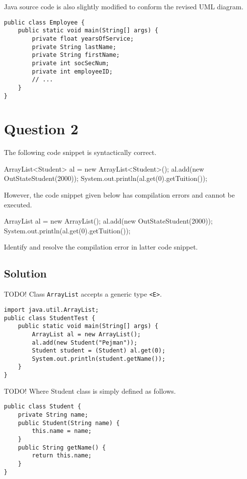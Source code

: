Java source code is also slightly modified to conform the revised UML diagram.

\begin{lstlisting}
public class Employee {
	public static void main(String[] args) {
		private float yearsOfService;
		private String lastName;
		private String firstName;
		private int socSecNum;
		private int employeeID;
		// ...
	}
}
\end{lstlisting}

\section{Question 2}

The following code snippet is syntactically correct.

\begin{darkListing}
ArrayList<Student> al = new ArrayList<Student>();
al.add(new OutStateStudent(2000));
System.out.println(al.get(0).getTuition());
\end{darkListing}

However, the code snippet given below has compilation errors and cannot be executed.

\begin{darkListing}
ArrayList al = new ArrayList();
al.add(new OutStateStudent(2000));
System.out.println(al.get(0).getTuition());
\end{darkListing}

Identify and resolve the compilation error in latter code snippet.

\subsection*{Solution}

TODO! Class \texttt{ArrayList} accepts a generic type \texttt{<E>}.

\begin{lstlisting}
import java.util.ArrayList;
public class StudentTest {
	public static void main(String[] args) {
		ArrayList al = new ArrayList();
		al.add(new Student("Pejman"));
		Student student = (Student) al.get(0);
		System.out.println(student.getName());
	}
}
\end{lstlisting}

TODO! Where Student class is simply defined as follows.

\begin{lstlisting}
public class Student {
	private String name;
	public Student(String name) {
		this.name = name;
	}
	public String getName() {
		return this.name;
	}
}
\end{lstlisting}

